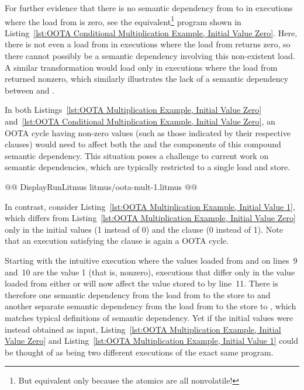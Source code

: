 \documentclass[10]{article}
\begin{document}
For further evidence that there is no semantic dependency from 
to  in executions where the load from  is zero, see the
equivalent\footnote{
	But equivalent only because the atomics are all nonvolatile!}
program shown in
Listing~\ref{lst:OOTA Conditional Multiplication Example, Initial Value Zero}.
Here, there is not even a load from  in executions where the
load from  returns zero, so there cannot possibly be a semantic
dependency involving this non-existent load.
A similar transformation would load  only in executions where the
load from  returned nonzero, which similarly illustrates the lack
of a semantic dependency between  and .

In both
Listings~\ref{lst:OOTA Multiplication Example, Initial Value Zero}
and~\ref{lst:OOTA Conditional Multiplication Example, Initial Value Zero},
an OOTA cycle having non-zero values (such as those indicated by their
respective  clauses) would need to affect both the 
and the  components of this compound semantic dependency.
This situation poses a challenge to current work on semantic dependencies,
which are typically restricted to a single load and store.

\begin{listing}[tbp]
@@ DisplayRunLitmus litmus/oota-mult-1.litmus @@
\caption{OOTA Multiplication Example, Initial Value 1}
\label{lst:OOTA Multiplication Example, Initial Value 1}
\end{listing}

In contrast, consider
Listing~\ref{lst:OOTA Multiplication Example, Initial Value 1},
which differs from
Listing~\ref{lst:OOTA Multiplication Example, Initial Value Zero}
only in the initial values (1 instead of 0) and the 
clause (0 instead of 1).
Note that an execution satisfying the  clause is again
a OOTA cycle.

Starting with the intuitive execution where the values loaded from 
and  on lines~9 and~10 are the value 1 (that is, nonzero), executions
that differ only in the value loaded from either  or  will
now affect the value stored to  by line~11.
There is therefore one semantic dependency from the load from 
to the store to  and another separate semantic dependency from
the load from  to the store to , which matches typical
definitions of semantic dependency.
Yet if the initial values were instead obtained as input,
Listing~\ref{lst:OOTA Multiplication Example, Initial Value Zero}
and
Listing~\ref{lst:OOTA Multiplication Example, Initial Value 1}
could be thought of as being two different executions of the exact same
program.
\end{document}
